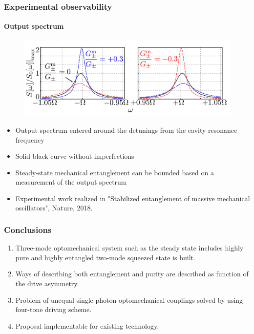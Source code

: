 \documentclass[aspectratio=43]{beamer}
\begin{document}
\begin{frame}

\frametitle{Experimental observability}
\framesubtitle{Output spectrum}
	
	\begin{figure}
		\includegraphics[width = 9 cm]{plots/plot_spectrum.png}
	\end{figure}	

	\begin{itemize}
		\item Output spectrum entered around the detunings from the cavity resonance frequency
		\item Solid black curve without imperfections
		\item Steady-state mechanical entanglement can be bounded based on a measurement of the output spectrum
		\item Experimental work realized in {\color{blue}"Stabilized entanglement of massive mechanical oscillators"}, Nature, 2018.
	\end{itemize}

\end{frame}

\begin{frame}

	\frametitle{Conclusions}
	
	\begin{enumerate}
		\item Three-mode optomechanical system such as the steady state includes highly pure and highly entangled two-mode squeezed state is built.
		\item Ways of describing both entanglement and purity are described as function of the drive asymmetry.
		\item Problem of unequal single-photon optomechanical couplings solved by using four-tone driving scheme.
		\item Proposal implementable for existing technology.
	\end{enumerate}
		
\end{frame}
\end{document}
